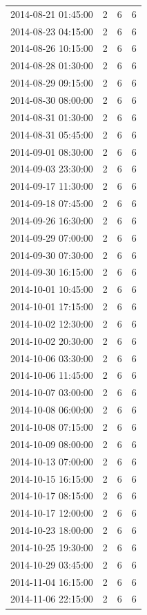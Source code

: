 \begin{tabular}{lrrr}
2014-08-21 01:45:00 & 2 & 6 & 6 \\
2014-08-23 04:15:00 & 2 & 6 & 6 \\
2014-08-26 10:15:00 & 2 & 6 & 6 \\
2014-08-28 01:30:00 & 2 & 6 & 6 \\
2014-08-29 09:15:00 & 2 & 6 & 6 \\
2014-08-30 08:00:00 & 2 & 6 & 6 \\
2014-08-31 01:30:00 & 2 & 6 & 6 \\
2014-08-31 05:45:00 & 2 & 6 & 6 \\
2014-09-01 08:30:00 & 2 & 6 & 6 \\
2014-09-03 23:30:00 & 2 & 6 & 6 \\
2014-09-17 11:30:00 & 2 & 6 & 6 \\
2014-09-18 07:45:00 & 2 & 6 & 6 \\
2014-09-26 16:30:00 & 2 & 6 & 6 \\
2014-09-29 07:00:00 & 2 & 6 & 6 \\
2014-09-30 07:30:00 & 2 & 6 & 6 \\
2014-09-30 16:15:00 & 2 & 6 & 6 \\
2014-10-01 10:45:00 & 2 & 6 & 6 \\
2014-10-01 17:15:00 & 2 & 6 & 6 \\
2014-10-02 12:30:00 & 2 & 6 & 6 \\
2014-10-02 20:30:00 & 2 & 6 & 6 \\
2014-10-06 03:30:00 & 2 & 6 & 6 \\
2014-10-06 11:45:00 & 2 & 6 & 6 \\
2014-10-07 03:00:00 & 2 & 6 & 6 \\
2014-10-08 06:00:00 & 2 & 6 & 6 \\
2014-10-08 07:15:00 & 2 & 6 & 6 \\
2014-10-09 08:00:00 & 2 & 6 & 6 \\
2014-10-13 07:00:00 & 2 & 6 & 6 \\
2014-10-15 16:15:00 & 2 & 6 & 6 \\
2014-10-17 08:15:00 & 2 & 6 & 6 \\
2014-10-17 12:00:00 & 2 & 6 & 6 \\
2014-10-23 18:00:00 & 2 & 6 & 6 \\
2014-10-25 19:30:00 & 2 & 6 & 6 \\
2014-10-29 03:45:00 & 2 & 6 & 6 \\
2014-11-04 16:15:00 & 2 & 6 & 6 \\
2014-11-06 22:15:00 & 2 & 6 & 6 \\

\end{tabular}
